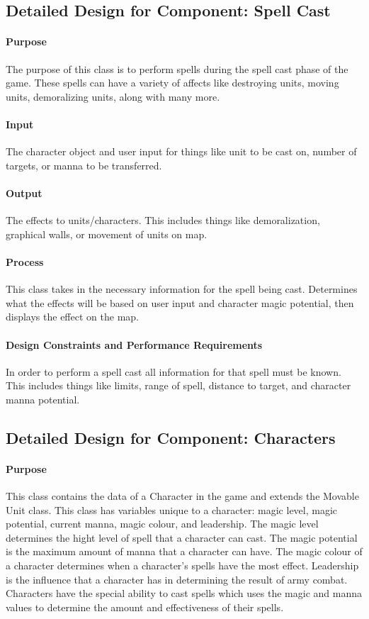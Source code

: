 \documentclass[12pt,a4paper,titlepage]{article}
\begin{document}
\subsection{Detailed Design for Component: Spell Cast}
\paragraph{Purpose} The purpose of this class is to perform spells during the spell cast phase of the game.  These spells can have a variety of affects like destroying units, moving units, demoralizing units, along with many more.  
\paragraph{Input} The character object and user input for things like unit to be cast on, number of targets, or manna to be transferred.  
\paragraph{Output} The effects to units/characters.  This includes things like demoralization, graphical walls, or movement of units on map.
\paragraph{Process} This class takes in the necessary information for the spell being cast.  Determines what the effects will be based on user input and character magic potential, then displays the effect on the map.
\paragraph{Design Constraints and Performance Requirements} In order to perform a spell cast all information for that spell must be known.  This includes things like limits, range of spell, distance to target, and character manna potential.  

\subsection{Detailed Design for Component: Characters}
\paragraph{Purpose} This class contains the data of a Character in the game and extends the Movable Unit class. This class has variables unique to a character: magic level, magic potential, current manna, magic colour, and leadership. The magic level determines the hight level of spell that a character can cast. The magic potential is the maximum amount of manna that a character can have. The magic colour of a character determines when a character's spells have the most effect. Leadership is the influence that a character has in determining the result of army combat. Characters have the special ability to cast spells which uses the magic and manna values to determine the amount and effectiveness of their spells. 
\end{document}
